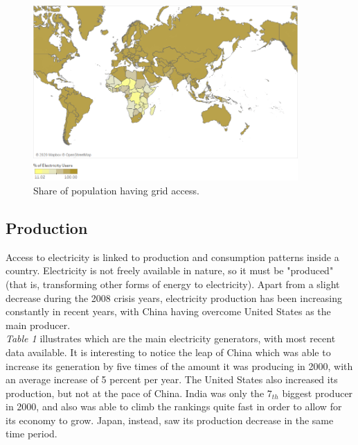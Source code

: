 \documentclass{book}
\begin{document}
\bigskip
\begin{figure}[H]
\begin{center}
\captionsetup{justification=centering}
\includegraphics[width=0.9\textwidth]{Images/access.png}
\caption{Share of population having grid access. }
\end{center}
\end{figure}
\bigskip

\subsection*{Production}

Access to electricity is linked to production and consumption patterns inside a country. Electricity is not freely available in nature, so it must be "produced" (that is, transforming other forms of energy to electricity). Apart from a slight decrease during the 2008 crisis years, electricity production has been increasing constantly in recent years, with China having overcome United States as the main producer.\\

\textit{Table 1} illustrates which are the main electricity generators, with most recent data available. It is interesting to notice the leap of China which was able to increase its generation by five times of the amount it was producing in 2000, with an average increase of 5 percent per year. The United States also increased its production, but not at the pace of China. India was only the $7_{th}$ biggest producer in 2000, and also was able to climb the rankings quite fast in order to allow for its economy to grow. Japan, instead, saw its production decrease in the same time period.
\end{document}

